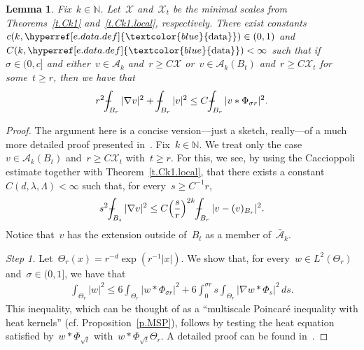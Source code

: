\documentclass[11pt,twoside]{article} %
\numberwithin{equation}{section}
\newtheorem{lemma}[theorem]{Lemma}
\theoremstyle{definition}
\newcommand{\dataref}{\hyperref[e.data.def]{\textcolor{blue}{\ensuremath{\mathrm{data}}}}}
\let\originalleft\left
\let\originalright\right
\renewcommand{\left}{\mathopen{}\mathclose\bgroup\originalleft}
\renewcommand{\right}{\aftergroup\egroup\originalright}
\newcommand*{\N}{\ensuremath{\mathbb{N}}}
\newcommand{\X}{\mathcal{X}}
\def\Xint#1{\mathchoice
{\XXint\displaystyle\textstyle{#1}}%
{\XXint\textstyle\scriptstyle{#1}}%
{\XXint\scriptstyle\scriptscriptstyle{#1}}%
{\XXint\scriptscriptstyle\scriptscriptstyle{#1}}%
\!\int}
\def\XXint#1#2#3{{\setbox0=\hbox{$#1{#2#3}{\int}$}
\vcenter{\hbox{$#2#3$}}\kern-.5\wd0}}
\def\fint{\Xint-}
\newcommand{\A}{\mathcal{A}}
\newcommand{\Ahom}{\bar{\A}}
\begin{document}
\begin{lemma}
\label{l.MSP.heat}
Fix~$k \in \N$. Let~$\X$ and~$\X_t$ be the minimal scales from Theorems~\ref{t.Ck1} and~\ref{t.Ck1.local}, respectively. There exist constants~$c(k,\dataref)\in (0,1)$ and~$C(k,\dataref)<\infty$ such that if~$\sigma \in (0,c]$ and either~$v \in \A_k$ and~$r \geq C \X$ or~$v \in \A_k(B_t)$ and~$r \geq C \X_t$ for some~$t \geq r$, then we have that
\begin{align}  \label{e.MSP.heat}
r^2 \fint_{B_{r} } |\nabla v|^2
+
\fint_{B_{r} } |v|^2  \leq C \fint_{ B_r } | v \ast \Phi_{\sigma r}|^2 
.
\end{align}
\end{lemma}
\begin{proof}
The argument here is a concise version---just a sketch, really---of a much more detailed proof presented in~\cite{AKMBook}. %
Fix~$k \in \N$. We treat only the case~$v \in \A_k(B_t)$ and~$r \geq  C \X_t$ with~$t\geq r$. For this, we see, by using the Caccioppoli estimate together with Theorem~\ref{t.Ck1.local}, that there exists a constant~$C(d,\lambda,\Lambda)<\infty$ such that, for every~$s \geq C^{-1}r$, 
\begin{align}  \label{e.MSP.heat.step0}
s^2 \fint_{B_s} | \nabla v|^2  \leq C \left(\frac sr\right)^{2k} \fint_{B_{r}} |v - (v)_{B_r}|^2  .
\end{align}
Notice that~$v$ has the extension outside of~$B_t$ as a member of~$\Ahom_k$. 




\smallskip
 
\emph{Step 1.}  Let~$\Theta_r(x) = r^{-d} \exp( r^{-1} |x|)$. We show that, for every~$w \in L^2(\Theta_r)$ and~$\sigma \in (0,1]$, we have that 
\begin{align}  \label{e.MSP.heat.step1}
\int_{\Theta_r} |w|^2 
\leq 
6 \int_{\Theta_r} | w \ast \Phi_{\sigma r}|^2 
+ 
6  \int_{0}^{\sigma r}  s \int_{\Theta_r} | \nabla w \ast \Phi_{s}|^2 \, ds
.
\end{align}
 This inequality, which can be thought of as a ``multiscale Poincar\'e inequality with heat kernels'' (cf. Proposition~\ref{p.MSP}), follows by testing the heat equation satisfied by~$w \ast \Phi_{\sqrt{t}}$ with~$w \ast \Phi_{\sqrt{t}} \Theta_r$. A detailed proof can be found in~\cite[Lemma 4.19]{AKMBook}. 
 
 \smallskip
 

\end{proof}
\end{document}
